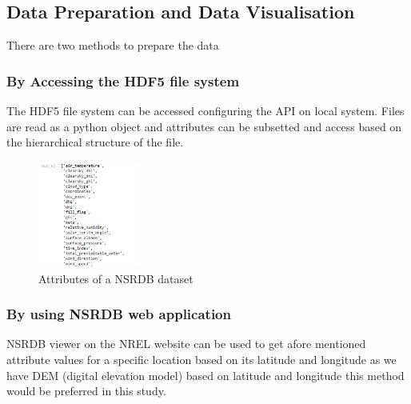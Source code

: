 \documentclass[letterpaper]{article}
\begin{document}
\subsection{Data Preparation and Data Visualisation}

There are two methods to prepare the data

\subsubsection{By Accessing the HDF5 file system}

The HDF5 file system can be accessed configuring the API on local system. Files are read as 
a python object and attributes can be subsetted and access based on the hierarchical structure
of the file. 


\begin{figure}[h]
    \centering
    \includegraphics[width=0.3\textwidth]{Attrs}
    \caption{Attributes of a NSRDB dataset}\label{fig}
\end{figure}

\subsubsection{By using NSRDB web application }

NSRDB viewer on the NREL website can be used to get afore mentioned attribute values for a specific
location based on its latitude and longitude as we have DEM (digital elevation model) based on 
latitude and longitude this method would be preferred in this study.
\end{document}
